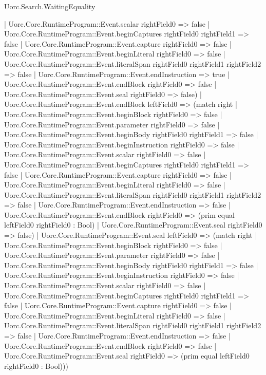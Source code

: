 \begin{lexlean}{Uorc.Search.WaitingEquality}
\begin{semanticmodule}
{      | Uorc.Core.RuntimeProgram::Event.scalar rightField0 => false
      | Uorc.Core.RuntimeProgram::Event.beginCaptures rightField0 rightField1 => false
      | Uorc.Core.RuntimeProgram::Event.capture rightField0 => false
      | Uorc.Core.RuntimeProgram::Event.beginLiteral rightField0 => false
      | Uorc.Core.RuntimeProgram::Event.literalSpan rightField0 rightField1 rightField2 => false
      | Uorc.Core.RuntimeProgram::Event.endInstruction => true
      | Uorc.Core.RuntimeProgram::Event.endBlock rightField0 => false
      | Uorc.Core.RuntimeProgram::Event.seal rightField0 => false)
    | Uorc.Core.RuntimeProgram::Event.endBlock leftField0 => (match right
      | Uorc.Core.RuntimeProgram::Event.beginBlock rightField0 => false
      | Uorc.Core.RuntimeProgram::Event.parameter rightField0 => false
      | Uorc.Core.RuntimeProgram::Event.beginBody rightField0 rightField1 => false
      | Uorc.Core.RuntimeProgram::Event.beginInstruction rightField0 => false
      | Uorc.Core.RuntimeProgram::Event.scalar rightField0 => false
      | Uorc.Core.RuntimeProgram::Event.beginCaptures rightField0 rightField1 => false
      | Uorc.Core.RuntimeProgram::Event.capture rightField0 => false
      | Uorc.Core.RuntimeProgram::Event.beginLiteral rightField0 => false
      | Uorc.Core.RuntimeProgram::Event.literalSpan rightField0 rightField1 rightField2 => false
      | Uorc.Core.RuntimeProgram::Event.endInstruction => false
      | Uorc.Core.RuntimeProgram::Event.endBlock rightField0 => (prim equal leftField0 rightField0 : Bool)
      | Uorc.Core.RuntimeProgram::Event.seal rightField0 => false)
    | Uorc.Core.RuntimeProgram::Event.seal leftField0 => (match right
      | Uorc.Core.RuntimeProgram::Event.beginBlock rightField0 => false
      | Uorc.Core.RuntimeProgram::Event.parameter rightField0 => false
      | Uorc.Core.RuntimeProgram::Event.beginBody rightField0 rightField1 => false
      | Uorc.Core.RuntimeProgram::Event.beginInstruction rightField0 => false
      | Uorc.Core.RuntimeProgram::Event.scalar rightField0 => false
      | Uorc.Core.RuntimeProgram::Event.beginCaptures rightField0 rightField1 => false
      | Uorc.Core.RuntimeProgram::Event.capture rightField0 => false
      | Uorc.Core.RuntimeProgram::Event.beginLiteral rightField0 => false
      | Uorc.Core.RuntimeProgram::Event.literalSpan rightField0 rightField1 rightField2 => false
      | Uorc.Core.RuntimeProgram::Event.endInstruction => false
      | Uorc.Core.RuntimeProgram::Event.endBlock rightField0 => false
      | Uorc.Core.RuntimeProgram::Event.seal rightField0 => (prim equal leftField0 rightField0 : Bool)))
}


\end{semanticmodule}
\end{lexlean}
